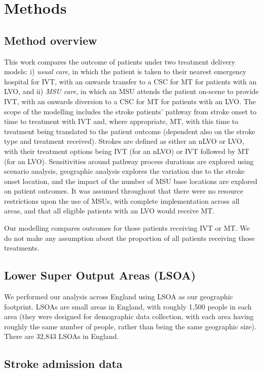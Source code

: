 \section{Methods}

\subsection{Method overview}

This work compares the outcome of patients under two treatment delivery models: i) \emph{usual care}, in which the patient is taken to their nearest emergency hospital for IVT, with an onwards transfer to a CSC for MT for patients with an LVO, and ii) \textit{MSU care}, in which an MSU attends the patient on-scene to provide IVT, with an onwards diversion to a CSC for MT for patients with an LVO. The scope of the modelling includes the stroke patients’ pathway from stroke onset to time to treatment with IVT and, where appropriate, MT, with this time to treatment being translated to the patient outcome (dependent also on the stroke type and treatment received). Strokes are defined as either an nLVO or LVO, with their treatment options being IVT (for an nLVO) or IVT followed by MT (for an LVO). Sensitivities around pathway process durations are explored using scenario analysis, geographic analysis explores the variation due to the stroke onset location, and the impact of the number of MSU base locations are explored on patient outcomes. It was assumed throughout that there were no resource restrictions upon the use of MSUs, with complete implementation across all areas, and that all eligible patients with an LVO would receive MT.

Our modelling compares outcomes for those patients receiving IVT or MT. We do not make any assumption about the proportion of all patients receiving those treatments.

\subsection{Lower Super Output Areas (LSOA)}

We performed our analysis across England using LSOA as our geographic footprint. LSOAs are small areas in England, with roughly 1,500 people in each area (they were designed for demographic data collection, with each area having roughly the same number of people, rather than being the same geographic size). There are 32,843 LSOAs in England.

\subsection{Stroke admission data}

